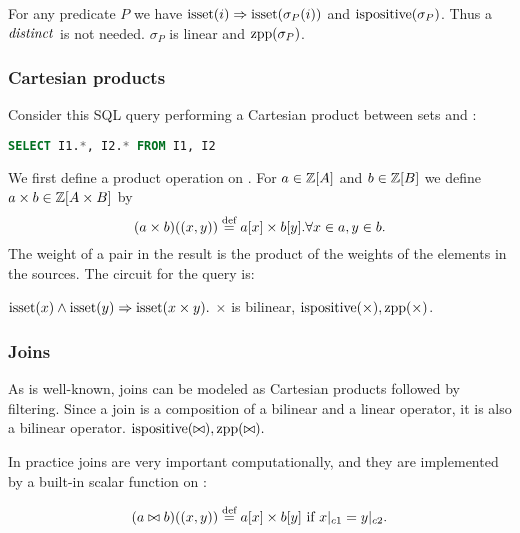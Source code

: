 For any predicate $P$ we have $\mbox{isset}(i) \Rightarrow
\mbox{isset}(\sigma_P(i))$ and $\mbox{ispositive}(\sigma_P)$.  Thus a $\mathit{distinct}$
is not needed.  $\sigma_P$ is linear and $\mbox{zpp}(\sigma_P)$.

\subsubsection{Cartesian products}

Consider this SQL query performing a Cartesian product
between sets  and :

\begin{lstlisting}[language=SQL]
SELECT I1.*, I2.* FROM I1, I2
\end{lstlisting}

We first define a product operation on \zrs.
For $a \in \mathbb{Z}[A]$ and $b \in \mathbb{Z}[B]$ we define $a \times b \in \mathbb{Z}[A \times B]$ by
$$(a \times b)((x,y)) \stackrel{\textrm{\scriptsize def}}{=} a[x] \times b[y] . \forall x \in a, y \in b.$$
The weight of a pair in the result is the product of the weights of the 
elements in the sources.  The circuit for the query is:

\begin{center}
\end{center}

$\mbox{isset}(x) \land \mbox{isset}(y) \Rightarrow \mbox{isset}(x \times y).$
$\times$ is bilinear, $\mbox{ispositive}(\times), \mbox{zpp}(\times)$.

\subsubsection{Joins}

As is well-known, joins can be modeled as Cartesian products
followed by filtering.  Since a join is a composition of a bilinear 
and a linear operator, it is also a bilinear operator.
$\mbox{ispositive}(\bowtie), \mbox{zpp}(\bowtie).$

In practice joins are very important computationally, and they are
implemented by a built-in scalar function on \zrs:

$$(a \bowtie b)((x,y)) \stackrel{\textrm{\scriptsize def}}{=} a[x] \times b[y] \mbox{ if } x|_{c1} = y|_{c2}.$$


